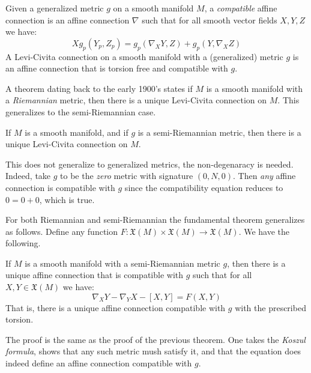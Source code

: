 \documentclass{beamer}
\begin{document}
    \begin{frame}
        Given a generalized metric $g$ on a smooth manifold $M$, a
        \textit{compatible} affine connection is an affine connection
        $\nabla$ such that for all smooth vector fields $X,Y,Z$ we have:
        \begin{equation}
            Xg_{p}(Y_{p},Z_{p})=
                g_{p}(\nabla_{X}Y,Z)+g_{p}(Y,\nabla_{X}Z)
        \end{equation}
        A Levi-Civita connection on a smooth manifold with a (generalized)
        metric $g$ is an affine connection that is torsion free and compatible
        with $g$.
    \end{frame}
    \begin{frame}
        A theorem dating back to the early 1900's states if $M$ is a smooth
        manifold with a \textit{Riemannian} metric, then there is a unique
        Levi-Civita connection on $M$. This generalizes to the semi-Riemannian
        case.
        \begin{theorem}
            If $M$ is a smooth manifold, and if $g$ is a semi-Riemannian metric,
            then there is a unique Levi-Civita connection on $M$.
        \end{theorem}
        This does not generalize to generalized metrics, the non-degenaracy
        is needed. Indeed, take $g$ to be the \textit{zero} metric with
        signature $(0,N,0)$. Then \textit{any} affine connection is compatible
        with $g$ since the compatibility equation reduces to $0=0+0$, which is
        true.
    \end{frame}
    \begin{frame}
        For both Riemannian and semi-Riemannian the fundamental theorem
        generalizes as follows. Define any function
        $F:\mathfrak{X}(M)\times\mathfrak{X}(M)\rightarrow\mathfrak{X}(M)$.
        We have the following.
        \begin{theorem}
            If $M$ is a smooth manifold with a semi-Riemannian metric $g$,
            then there is a unique affine connection that is compatible with $g$
            such that for all $X,Y\in\mathfrak{X}(M)$ we have:
            \begin{equation}
                \nabla_{X}Y-\nabla_{Y}X-[X,Y]=F(X,Y)
            \end{equation}
            That is, there is a unique affine connection compatible with $g$
            with the prescribed torsion.
        \end{theorem}
        The proof is the same as the proof of the previous theorem. One takes
        the \textit{Koszul formula}, shows that any such metric mush satisfy it,
        and that the equation does indeed define an affine connection
        compatible with $g$.
    \end{frame}
\end{document}
